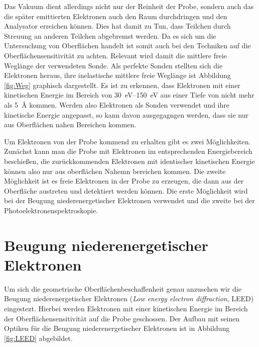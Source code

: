     Das Vakuum dient allerdings nicht nur der Reinheit der Probe, sondern auch das die später emittierten Elektronen auch den Raum durchdringen und den Analysator erreichen können.
    Dies hat damit zu Tun, dass Teilchen durch Streuung an anderen Teilchen abgebremst werden.
    Da es sich um die Untersuchung von Oberflächen handelt ist somit auch bei den Techniken auf die Oberflächensensitivität zu achten.
    Relevant wird damit die mittlere freie Weglänge der verwendeten Sonde.
    Als perfekte Sonden stellten sich die Elektronen heraus, ihre inelastische mittlere freie Weglänge ist Abbildung \ref{fig:Weg} graphisch dargestellt.
    Es ist zu erkennen, dass Elektronen mit einer kinetischen Energie im Bereich von \SIrange{30}{150}{\electronvolt} aus einer Tiefe von nicht mehr als \SI{5}{\angstrom} kommen.
    Werden also Elektronen als Sonden verwendet und ihre kinetische Energie angepasst, so kann davon ausgegagngen werden, dass sie nur aus Oberflächen nahen Bereichen kommen.

    Um Elektronen von der Probe kommend zu erhalten gibt es zwei Möglichkeiten.
    Zunächst kann man die Probe mit Elektronen im entsprechenden Energiebereich beschießen, die zurückkommenden Elektronen mit identischer kinetischen Energie können also nur aus oberflächen Nahemn bereichen kommen.
    Die zweite Möglichkeit ist es freie Elektronen in der Probe zu erzeugen, die dann aus der Oberfläche austreten und detektiert werden können.
    Die erste Möglichkeit wird bei der Beugung niederenergetischer Elektronen verwendet und die zweite bei der Photoelektronenspektroskopie.


    \section{Beugung niederenergetischer Elektronen} \label{sec:LEED}
    Um sich die geometrische Oberflächenbeschaffenheit genau anzusehen wir die Beugung niederenergetischer Elektronen (\textit{Low energy electron diffraction}, LEED) eingestezt.
    Hierbei werden Elektronen mit einer kinetischen Energie im Bereich der Oberflächensensitivität auf die Probe geschossen.
    Der Aufbau mit seinen Optiken für die Beugung niederenergetischer Elektronen ist in Abbildung \ref{fig:LEED} abgebildet.

